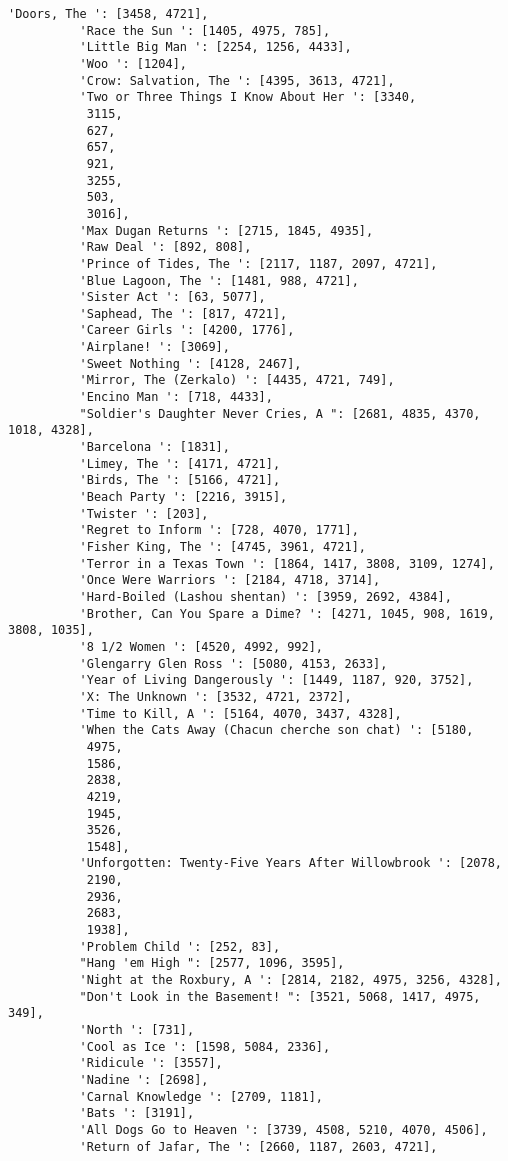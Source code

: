 \documentclass[11pt]{article}
\begin{document}
\begin{Verbatim}[commandchars=\\\{\}]
          'Doors, The ': [3458, 4721],
          'Race the Sun ': [1405, 4975, 785],
          'Little Big Man ': [2254, 1256, 4433],
          'Woo ': [1204],
          'Crow: Salvation, The ': [4395, 3613, 4721],
          'Two or Three Things I Know About Her ': [3340,
           3115,
           627,
           657,
           921,
           3255,
           503,
           3016],
          'Max Dugan Returns ': [2715, 1845, 4935],
          'Raw Deal ': [892, 808],
          'Prince of Tides, The ': [2117, 1187, 2097, 4721],
          'Blue Lagoon, The ': [1481, 988, 4721],
          'Sister Act ': [63, 5077],
          'Saphead, The ': [817, 4721],
          'Career Girls ': [4200, 1776],
          'Airplane! ': [3069],
          'Sweet Nothing ': [4128, 2467],
          'Mirror, The (Zerkalo) ': [4435, 4721, 749],
          'Encino Man ': [718, 4433],
          "Soldier's Daughter Never Cries, A ": [2681, 4835, 4370, 1018, 4328],
          'Barcelona ': [1831],
          'Limey, The ': [4171, 4721],
          'Birds, The ': [5166, 4721],
          'Beach Party ': [2216, 3915],
          'Twister ': [203],
          'Regret to Inform ': [728, 4070, 1771],
          'Fisher King, The ': [4745, 3961, 4721],
          'Terror in a Texas Town ': [1864, 1417, 3808, 3109, 1274],
          'Once Were Warriors ': [2184, 4718, 3714],
          'Hard-Boiled (Lashou shentan) ': [3959, 2692, 4384],
          'Brother, Can You Spare a Dime? ': [4271, 1045, 908, 1619, 3808, 1035],
          '8 1/2 Women ': [4520, 4992, 992],
          'Glengarry Glen Ross ': [5080, 4153, 2633],
          'Year of Living Dangerously ': [1449, 1187, 920, 3752],
          'X: The Unknown ': [3532, 4721, 2372],
          'Time to Kill, A ': [5164, 4070, 3437, 4328],
          'When the Cats Away (Chacun cherche son chat) ': [5180,
           4975,
           1586,
           2838,
           4219,
           1945,
           3526,
           1548],
          'Unforgotten: Twenty-Five Years After Willowbrook ': [2078,
           2190,
           2936,
           2683,
           1938],
          'Problem Child ': [252, 83],
          "Hang 'em High ": [2577, 1096, 3595],
          'Night at the Roxbury, A ': [2814, 2182, 4975, 3256, 4328],
          "Don't Look in the Basement! ": [3521, 5068, 1417, 4975, 349],
          'North ': [731],
          'Cool as Ice ': [1598, 5084, 2336],
          'Ridicule ': [3557],
          'Nadine ': [2698],
          'Carnal Knowledge ': [2709, 1181],
          'Bats ': [3191],
          'All Dogs Go to Heaven ': [3739, 4508, 5210, 4070, 4506],
          'Return of Jafar, The ': [2660, 1187, 2603, 4721],

\end{Verbatim}
\end{document}
